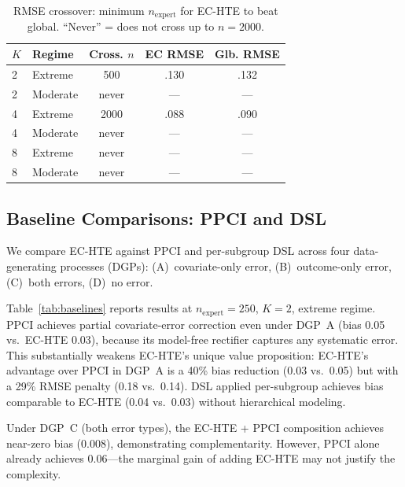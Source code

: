 \documentclass[11pt]{article}
\begin{document}
\begin{table}[t]
\centering
\small
\caption{RMSE crossover: minimum $n_{\text{expert}}$ for EC-HTE to beat global. ``Never'' = does not cross up to $n{=}2000$.}
\label{tab:budget}
\begin{tabular}{@{}llccc@{}}
\toprule
$K$ & Regime & Cross. $n$ & EC RMSE & Glb. RMSE \\
\midrule
2 & Extreme & 500 & .130 & .132 \\
2 & Moderate & never & --- & --- \\
4 & Extreme & 2000 & .088 & .090 \\
4 & Moderate & never & --- & --- \\
8 & Extreme & never & --- & --- \\
8 & Moderate & never & --- & --- \\
\bottomrule
\end{tabular}
\end{table}

\subsection{Baseline Comparisons: PPCI and DSL}
\label{sec:exp-baselines}

We compare EC-HTE against PPCI \citep{sui2026ppci} and per-subgroup DSL \citep{egami2024using} across four data-generating processes (DGPs):
(A)~covariate-only error, (B)~outcome-only error, (C)~both errors, (D)~no error.

Table~\ref{tab:baselines} reports results at $n_{\text{expert}}{=}250$, $K{=}2$, extreme regime.
PPCI achieves partial covariate-error correction even under DGP~A (bias 0.05 vs.\ EC-HTE 0.03), because its model-free rectifier captures any systematic error.
This substantially weakens EC-HTE's unique value proposition: EC-HTE's advantage over PPCI in DGP~A is a 40\% bias reduction (0.03 vs.\ 0.05) but with a 29\% RMSE penalty (0.18 vs.\ 0.14).
DSL applied per-subgroup achieves bias comparable to EC-HTE (0.04 vs.\ 0.03) without hierarchical modeling.

Under DGP~C (both error types), the EC-HTE + PPCI composition achieves near-zero bias (0.008), demonstrating complementarity.
However, PPCI alone already achieves 0.06---the marginal gain of adding EC-HTE may not justify the complexity.
\end{document}
